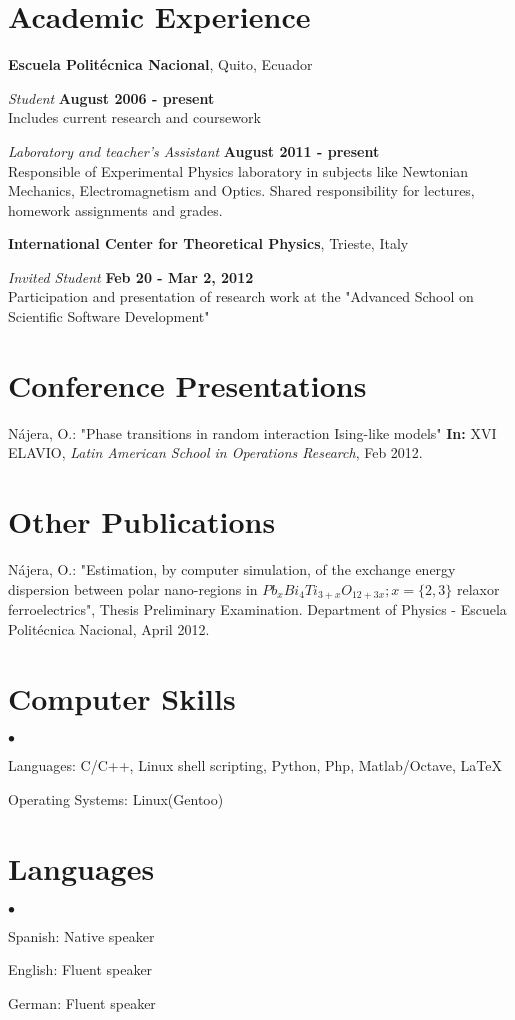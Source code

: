 \documentclass[margin,line]{res}
\newenvironment{list2}{
  \begin{list}{$\bullet$}{%
      \setlength{\itemsep}{0in}
      \setlength{\parsep}{0in} \setlength{\parskip}{0in}
      \setlength{\topsep}{0in} \setlength{\partopsep}{0in} 
      \setlength{\leftmargin}{0.2in}}}{\end{list}}
\begin{document}
\begin{resume}
\section{\sc Academic Experience}
{\bf Escuela Politécnica Nacional}, Quito, Ecuador

\vspace{-.3cm}
{\em Student} \hfill {\bf August 2006 - present}\\
Includes current research and coursework

{\em Laboratory and teacher's Assistant} \hfill {\bf August 2011 - present}\\
Responsible of Experimental Physics laboratory in subjects
like Newtonian Mechanics, Electromagnetism and Optics.
Shared responsibility for lectures, homework assignments and grades.

{\bf International Center for Theoretical Physics}, Trieste, Italy

\vspace{-.3cm}
{\em Invited Student} \hfill {\bf Feb 20 - Mar 2, 2012} \\
Participation and presentation of research work at the "Advanced School on Scientific Software Development"

\section{\sc Conference Presentations}
Nájera, O.: "Phase transitions in random interaction Ising-like models" {\bf In:} XVI ELAVIO, {\em Latin American School in Operations Research}, Feb 2012.

\section{\sc Other Publications}
Nájera, O.: "Estimation, by computer simulation, of the exchange energy dispersion between polar nano-regions in $Pb_xBi_4Ti_{3+x}O_{12+3x}; x=\{2,3\}$ relaxor ferroelectrics", Thesis Preliminary Examination. Department of Physics - Escuela Politécnica Nacional, April 2012.


\section{\sc Computer Skills}
\begin{list2}
\item Languages:  C/C++, Linux shell scripting, Python, Php, Matlab/Octave, \LaTeX
\item Operating Systems:  Linux(Gentoo)
\end{list2}

\section{\sc Languages}
\begin{list2}
\item Spanish: Native speaker
\item English: Fluent speaker
\item German: Fluent speaker
\end{list2}

\end{resume}
\end{document}
